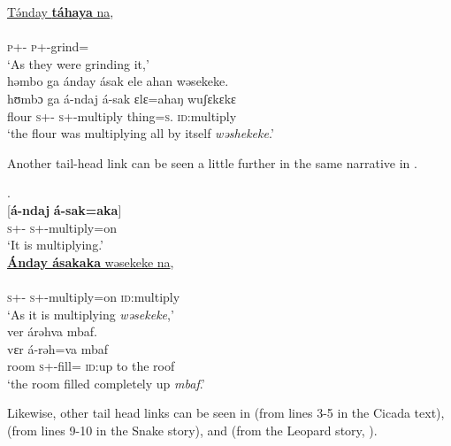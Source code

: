 \medskip
\underline{T\'ənday  \textbf{táhaya} na},\\
\gll {}  \\
     \textsc{p}+{\IFV}-{\PRG}  \textsc{p}+{\IFV}-grind={\PLU}    {\PSP}\\
\glt  ‘As they were grinding it,’\\ 

\medskip
 həmbo  ga  ánday  ásak  ele  ahan  wəsekeke. \\
\gll hʊmbɔ ga á-ndaj á-sak ɛlɛ=ahaŋ wuʃɛkɛkɛ\\
     flour   {\ADJ}  \textsc{s}+{\IFV}-{\PRG}  \textsc{s}+{\IFV}-multiply    thing=\textsc{s}.{\POSS}  \textsc{id}:multiply\\
\glt ‘the flour was multiplying all by itself \textit{wəshekeke}.’
\z

Another tail-head link can be seen a little further in the same narrative in . 

\ea \label{ex:11:22}.\\     
\gll  {}[\textbf{á-ndaj}  \textbf{á-sak=aka}]\\  
      \textsc{s}+{\IFV}-{\PROG} \textsc{s}+{\IFV}-multiply=on \\  
\glt ‘It is multiplying.’\\

\medskip
\underline{\textbf{Ánday  ásakaka}  wəsekeke  na},\\
\gll {}   \\ 
     \textsc{s}+{\IFV}-{\PRG}  \textsc{s}+{\IFV}-multiply=on  \textsc{id}:multiply  {\PSP} \\
\glt ‘As it is multiplying \textit{wəsekeke},’\\

\medskip
ver  árəhva  mbaf.\\
\gll vɛr á-rəh=va mbaf\\
     room  \textsc{s}+{\IFV}-fill={\PRF}  \textsc{id}:{up to the roof}\\
\glt  ‘the room filled completely up \textit{mbaf}.’
\z

Likewise, other tail head links can be seen in  (from lines 3-5 in the Cicada text),  (from lines 9-10 in the Snake story), and  (from the Leopard story, \citealt{Friesen2003}). 

